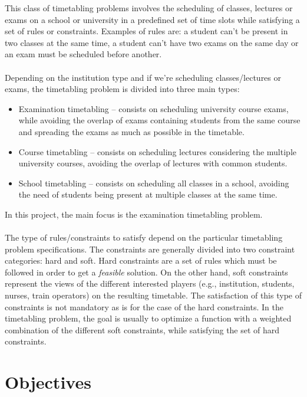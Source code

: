 This class of timetabling problems involves the scheduling of classes, lectures or exams on a school or university in a predefined set of time slots while satisfying a set of rules or constraints. Examples of rules are: a student can't be present in two classes at the same time, a student can't have two exams on the same day or an exam must be scheduled before another.\\
\\
Depending on the institution type and if we're scheduling classes/lectures or exams, the timetabling problem is divided into three main types:\\
\begin{itemize}
	\item Examination timetabling -- consists on scheduling university course exams, while avoiding the overlap of exams containing students from the same course and spreading the exams as much as possible in the timetable.
	\item Course timetabling -- consists on scheduling lectures considering the multiple university courses, avoiding the overlap of lectures with common students.
	\item School timetabling -- consists on scheduling all classes in a school, avoiding the need of students being present at multiple classes at the same time.
\end{itemize}
In this project, the main focus is the examination timetabling problem. \\
\\
The type of rules/constraints to satisfy depend on the particular timetabling problem specifications. The constraints are generally divided into two constraint categories: hard and soft. Hard constraints are a set of rules which must be followed in order to get a \textit{feasible} solution. On the other hand, soft constraints represent the views of the different interested players (e.g., institution, students, nurses, train operators) on the resulting timetable. The satisfaction of this type of constraints is not mandatory as is for the case of the hard constraints. In the timetabling problem, the goal is usually to optimize a function with a weighted combination of the different soft constraints, while satisfying the set of hard constraints. 

\section{Objectives}
\label{section:Objts}

